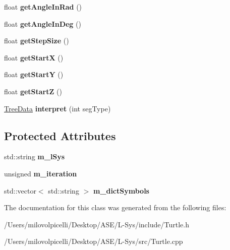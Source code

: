 \begin{DoxyCompactItemize}
float {\bfseries get\+Angle\+In\+Rad} ()
\item 
\mbox{\label{class_turtle_a9f69ab80da8bd40f4d6b36f0e1dc6b7e}} 
float {\bfseries get\+Angle\+In\+Deg} ()
\item 
\mbox{\label{class_turtle_a20b1c3d09290499f11b715948714b7e9}} 
float {\bfseries get\+Step\+Size} ()
\item 
\mbox{\label{class_turtle_a893b42c134b1de8dd011b53f46178934}} 
float {\bfseries get\+StartX} ()
\item 
\mbox{\label{class_turtle_a1c6f807f90c36b7107985e96fc5df418}} 
float {\bfseries get\+StartY} ()
\item 
\mbox{\label{class_turtle_a08bd369ff1cd3c3285dd6015dedb31d0}} 
float {\bfseries get\+StartZ} ()
\item 
\mbox{\label{class_turtle_af52f8b3feac20a0e51ee8c41f76a98be}} 
\hyperlink{struct_tree_data}{Tree\+Data} {\bfseries interpret} (int seg\+Type)
\end{DoxyCompactItemize}
\subsection*{Protected Attributes}
\begin{DoxyCompactItemize}
\item 
\mbox{\label{class_turtle_a866035dbb9252cd0a3655041284c54e2}} 
std\+::string {\bfseries m\+\_\+l\+Sys}
\item 
\mbox{\label{class_turtle_af377f70c8b1bfccd35b6e6261d2960ee}} 
unsigned {\bfseries m\+\_\+iteration}
\item 
\mbox{\label{class_turtle_a9997138703673d00456cf8f2c2588024}} 
std\+::vector$<$ std\+::string $>$ {\bfseries m\+\_\+dict\+Symbols}
\end{DoxyCompactItemize}


The documentation for this class was generated from the following files\+:\begin{DoxyCompactItemize}
\item 
/\+Users/milovolpicelli/\+Desktop/\+A\+S\+E/\+L-\/\+Sys/include/Turtle.\+h\item 
/\+Users/milovolpicelli/\+Desktop/\+A\+S\+E/\+L-\/\+Sys/src/Turtle.\+cpp\end{DoxyCompactItemize}
